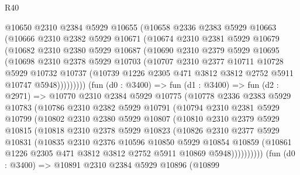\begin{lexlean}{R40}
\begin{coremodule}
        @10650
          @2310
          @2384
          @5929
          @10655
          (@10658
            @2336
            @2383
            @5929
            @10663
            (@10666
              @2310
              @2382
              @5929
              @10671
              (@10674
                @2310
                @2381
                @5929
                @10679
                (@10682
                  @2310
                  @2380
                  @5929
                  @10687
                  (@10690
                    @2310
                    @2379
                    @5929
                    @10695
                    (@10698
                      @2310
                      @2378
                      @5929
                      @10703
                      (@10707
                        @2310
                        @2377
                        @10711
                        @10728
                        @5929
                        @10732
                        @10737
                        (@10739 @1226 @2305 @471 @3812 @3812 @2752 @5911 @10747 @5948)))))))))
        (fun (d0 : @3400) =>
        fun (d1 : @3400) =>
        fun (d2 : @2971) =>
        @10770
          @2310
          @2384
          @5929
          @10775
          (@10778
            @2336
            @2383
            @5929
            @10783
            (@10786
              @2310
              @2382
              @5929
              @10791
              (@10794
                @2310
                @2381
                @5929
                @10799
                (@10802
                  @2310
                  @2380
                  @5929
                  @10807
                  (@10810
                    @2310
                    @2379
                    @5929
                    @10815
                    (@10818
                      @2310
                      @2378
                      @5929
                      @10823
                      (@10826
                        @2310
                        @2377
                        @5929
                        @10831
                        (@10835
                          @2310
                          @2376
                          @10596
                          @10850
                          @5929
                          @10854
                          @10859
                          (@10861 @1226 @2305 @471 @3812 @3812 @2752 @5911 @10869 @5948))))))))))
        (fun (d0 : @3400) =>
        @10891
          @2310
          @2384
          @5929
          @10896
          (@10899

\end{coremodule}
\end{lexlean}
